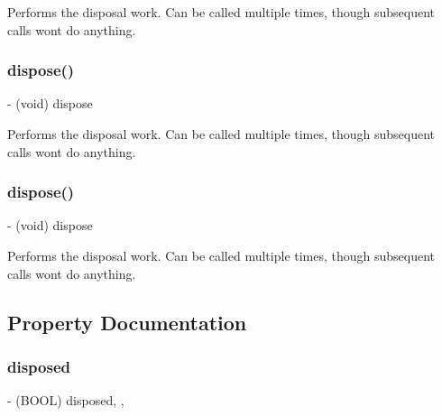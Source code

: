 Performs the disposal work. Can be called multiple times, though subsequent calls won\textquotesingle{}t do anything. \mbox{\label{interface_r_a_c_disposable_a3158dc03efcf49e7a5174acc6e3711d5}} 
\subsubsection{\texorpdfstring{dispose()}{dispose()}\hspace{0.1cm}{\footnotesize\ttfamily [2/3]}}
{\footnotesize\ttfamily -\/ (void) dispose \begin{DoxyParamCaption}{ }\end{DoxyParamCaption}}

Performs the disposal work. Can be called multiple times, though subsequent calls won\textquotesingle{}t do anything. \mbox{\label{interface_r_a_c_disposable_a3158dc03efcf49e7a5174acc6e3711d5}} 
\subsubsection{\texorpdfstring{dispose()}{dispose()}\hspace{0.1cm}{\footnotesize\ttfamily [3/3]}}
{\footnotesize\ttfamily -\/ (void) dispose \begin{DoxyParamCaption}{ }\end{DoxyParamCaption}}

Performs the disposal work. Can be called multiple times, though subsequent calls won\textquotesingle{}t do anything. 

\subsection{Property Documentation}
\mbox{\label{interface_r_a_c_disposable_a7d04c8119d838353c8d4e5eb45dc79f1}} 
\subsubsection{\texorpdfstring{disposed}{disposed}}
{\footnotesize\ttfamily -\/ (B\+O\+OL) disposed\hspace{0.3cm}{\ttfamily [read]}, {\ttfamily [atomic]}, {\ttfamily [assign]}}

